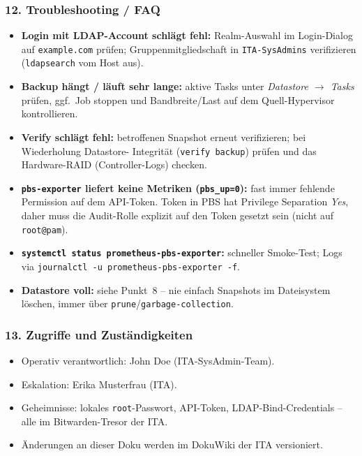 \subsubsection*{12. Troubleshooting / FAQ}
\begin{itemize}\setlength{\itemsep}{1pt}
    \item \textbf{Login mit LDAP-Account schlägt fehl:}
          Realm-Auswahl im Login-Dialog auf \texttt{example.com}
          prüfen; Gruppenmitgliedschaft in
          \texttt{ITA-SysAdmins} verifizieren
          (\texttt{ldapsearch} vom Host aus).
    \item \textbf{Backup hängt / läuft sehr lange:} aktive Tasks
          unter \emph{Datastore $\to$ Tasks} prüfen,
          ggf.\ Job stoppen und Bandbreite/Last auf dem
          Quell-Hypervisor kontrollieren.
    \item \textbf{Verify schlägt fehl:} betroffenen Snapshot
          erneut verifizieren; bei Wiederholung Datastore-
          Integrität (\texttt{verify backup}) prüfen und das
          Hardware-\ac{RAID} (Controller-Logs) checken.
    \item \textbf{\texttt{pbs-exporter} liefert keine Metriken
          (\texttt{pbs\_up=0}):} fast immer fehlende Permission
          auf dem API-Token. Token in PBS hat Privilege Separation
          \emph{Yes}, daher muss die Audit-Rolle explizit auf den
          Token gesetzt sein (nicht auf \texttt{root@pam}).
    \item \textbf{\texttt{systemctl status prometheus-pbs-exporter}:}
          schneller Smoke-Test; Logs via
          \texttt{journalctl -u prometheus-pbs-exporter -f}.
    \item \textbf{Datastore voll:} siehe Punkt~8 -- nie einfach
          Snapshots im Dateisystem löschen, immer über
          \texttt{prune}/\texttt{garbage-collection}.
\end{itemize}

\subsubsection*{13. Zugriffe und Zuständigkeiten}
\begin{itemize}\setlength{\itemsep}{1pt}
    \item Operativ verantwortlich: John Doe
          (\ac{ITA}-SysAdmin-Team).
    \item Eskalation: Erika Musterfrau (\ac{ITA}).
    \item Geheimnisse: lokales \texttt{root}-Passwort, API-Token,
          LDAP-Bind-Credentials -- alle im Bitwarden-Tresor der
          \ac{ITA}.
    \item Änderungen an dieser Doku werden im DokuWiki der
          \ac{ITA} versioniert.
\end{itemize}
